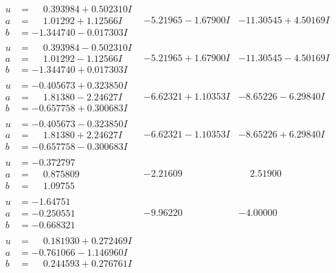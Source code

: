 \documentclass[1p]{elsarticle_modified}
\theoremstyle{definition}
\begin{document}
$$\begin{array}{c|c|c}
\begin{aligned}
u &= \phantom{-}0.393984 + 0.502310 I \\
a &= \phantom{-}1.01292 + 1.12566 I \\
b &= -1.344740 - 0.017303 I\end{aligned}
 & -5.21965 - 1.67900 I & -11.30545 + 4.50169 I \\ \hline\begin{aligned}
u &= \phantom{-}0.393984 - 0.502310 I \\
a &= \phantom{-}1.01292 - 1.12566 I \\
b &= -1.344740 + 0.017303 I\end{aligned}
 & -5.21965 + 1.67900 I & -11.30545 - 4.50169 I \\ \hline\begin{aligned}
u &= -0.405673 + 0.323850 I \\
a &= \phantom{-}1.81380 - 2.24627 I \\
b &= -0.657758 + 0.300683 I\end{aligned}
 & -6.62321 + 1.10353 I & -8.65226 - 6.29840 I \\ \hline\begin{aligned}
u &= -0.405673 - 0.323850 I \\
a &= \phantom{-}1.81380 + 2.24627 I \\
b &= -0.657758 - 0.300683 I\end{aligned}
 & -6.62321 - 1.10353 I & -8.65226 + 6.29840 I \\ \hline\begin{aligned}
u &= -0.372797\phantom{ +0.000000I} \\
a &= \phantom{-}0.875809\phantom{ +0.000000I} \\
b &= \phantom{-}1.09755\phantom{ +0.000000I}\end{aligned}
 & -2.21609\phantom{ +0.000000I} & \phantom{-}2.51900\phantom{ +0.000000I} \\ \hline\begin{aligned}
u &= -1.64751\phantom{ +0.000000I} \\
a &= -0.250551\phantom{ +0.000000I} \\
b &= -0.668321\phantom{ +0.000000I}\end{aligned}
 & -9.96220\phantom{ +0.000000I} & -4.00000\phantom{ +0.000000I} \\ \hline\begin{aligned}
u &= \phantom{-}0.181930 + 0.272469 I \\
a &= -0.761066 - 1.146960 I \\
b &= \phantom{-}0.244593 + 0.276761 I\end{aligned}

\end{array}$$
\end{document}
